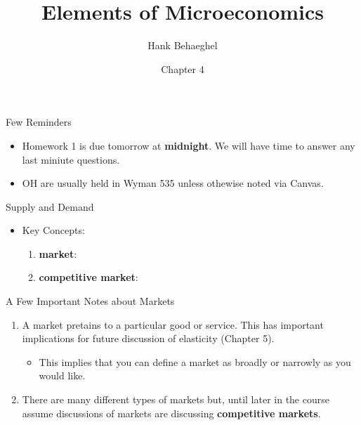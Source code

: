 \documentclass[aspectratio=169]{beamer}
\title{Elements of Microeconomics}
\author{Hank Behaeghel}
\institute{Johns Hopkins University}
\date{Chapter 4}
\begin{document}
\maketitle

\begin{frame}{Few Reminders}
    \begin{itemize}
        \item Homework 1 is due tomorrow at \textbf{midnight}. We will have time to answer any last miniute questions.
        \vspace{5mm}
        \item OH are usually held in Wyman 535 unless othewise noted via Canvas.
    \end{itemize}
\end{frame}

\begin{frame}{Supply and Demand}
    \begin{itemize}
        \item Key Concepts:
        \vspace{5mm}
        \begin{enumerate}
            \item<1-> \textbf{market}: 
            \vspace{5mm}
            \item<3-> \textbf{competitive market}: 
        \end{enumerate}
    \end{itemize}
    
\end{frame}

\begin{frame}{A Few Important Notes about Markets}
    \begin{enumerate}
        \item A market pretains to a particular good or service. This has important implications for future discussion of elasticity (Chapter 5).
        \vspace{5mm}
        \begin{itemize}
            \item This implies that you can define a market as broadly or narrowly as you would like.
        \end{itemize}
        \vspace{5mm}
        \item There are many different types of markets but, until later in the course assume discussions of markets are discussing \textbf{competitive markets}.
    \end{enumerate}
\end{frame}
\end{document}
